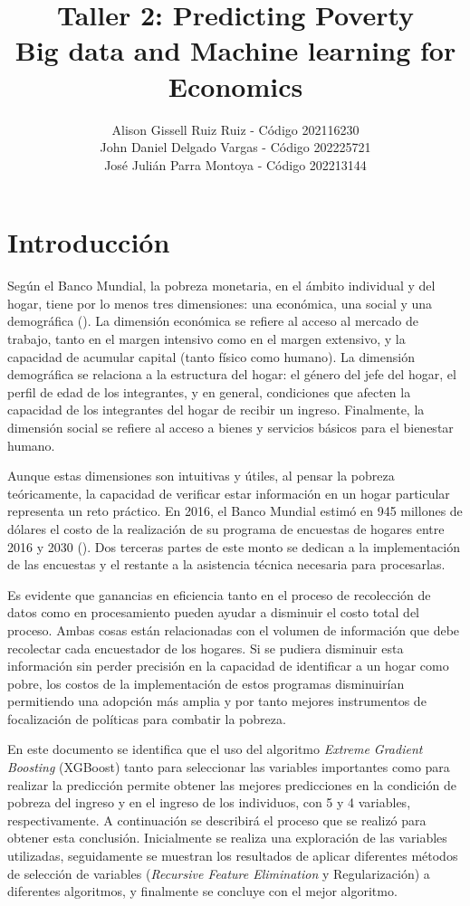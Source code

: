 \documentclass[11pt,a4paper]{article}
\title{\bf Taller 2: Predicting Poverty \\ Big data and Machine learning for Economics}
\author{Alison Gissell Ruiz Ruiz - Código 202116230\\ 
John Daniel Delgado Vargas - Código 202225721\\
José Julián Parra Montoya - Código 202213144 }
\date{}
\begin{document}
\maketitle

\section{Introducción}

Según el Banco Mundial, la pobreza monetaria, en el ámbito individual y del hogar, tiene por lo menos tres dimensiones: una económica, una social y una demográfica (\cite{mundial2005poverty}). La dimensión económica se refiere al acceso al mercado de trabajo, tanto en el margen intensivo como en el margen extensivo, y la capacidad de acumular capital (tanto físico como humano). La dimensión demográfica se relaciona a la estructura del hogar: el género del jefe del hogar, el perfil de edad de los integrantes, y en general, condiciones que afecten la capacidad de los integrantes del hogar de recibir un ingreso. Finalmente, la dimensión social se refiere al acceso a bienes y servicios básicos para el bienestar humano.

Aunque estas dimensiones son intuitivas y útiles, al pensar la pobreza teóricamente, la capacidad de verificar estar información en un hogar particular representa un reto práctico. En 2016, el Banco Mundial estimó en 945 millones de dólares el costo de la realización de su programa de encuestas de hogares entre 2016 y 2030 (\cite{mundial2005poverty}). Dos terceras partes de este monto se dedican a la implementación de las encuestas y el restante a la asistencia técnica necesaria para procesarlas.

Es evidente que ganancias en eficiencia tanto en el proceso de recolección de datos como en procesamiento pueden ayudar a disminuir el costo total del proceso. Ambas cosas están relacionadas con el volumen de información que debe recolectar cada encuestador de los hogares. Si se pudiera disminuir esta información sin perder precisión en la capacidad de identificar a un hogar como pobre, los costos de la implementación de estos programas disminuirían permitiendo una adopción más amplia y por tanto mejores instrumentos de focalización de políticas para combatir la pobreza.

En este documento se identifica que el uso del algoritmo \emph{Extreme Gradient Boosting} (XGBoost) tanto para seleccionar las variables importantes como para realizar la predicción permite obtener las mejores predicciones en la condición de pobreza del ingreso y en el ingreso de los individuos, con 5 y 4 variables, respectivamente. A continuación se describirá el proceso que se realizó para obtener esta conclusión. Inicialmente se realiza una exploración de las variables utilizadas, seguidamente se muestran los resultados de aplicar diferentes métodos de selección de variables (\emph{Recursive Feature Elimination} y Regularización) a diferentes algoritmos, y finalmente se concluye con el mejor algoritmo.
\end{document}
